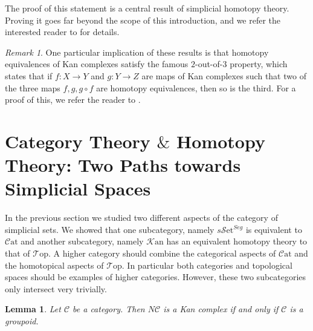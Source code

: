 \documentclass[11pt, a4paper]{amsart}
\newcommand{\cC}{\mathcal{C}}
\newcommand{\sSet}{s\mathscr{S}\mathrm{et}}
\newcommand{\Cat}{\mathscr{C}\mathrm{at}}
\newcommand{\Top}{\mathscr{T}\mathrm{op}}
\newcommand{\Kan}{\mathscr{K}\mathrm{an}}
\newtheorem{lemma}[equation]{Lemma}
\theoremstyle{definition}
\theoremstyle{remark}
\newtheorem{remark}[equation]{Remark}
\numberwithin{equation}{section}
\begin{document}
The proof of this statement is a central result of simplicial homotopy theory. Proving it goes far beyond the scope of this introduction, and we refer the interested reader to \cite{goerssjardine2009simplicialhomotopytheory} for details.

\begin{remark} \label{rem:two out of three}
  One particular implication of these results is that homotopy equivalences of Kan complexes satisfy the famous $2$-out-of-$3$ property, which states that if $f\colon X \to Y$ and $g\colon Y \to Z$ are maps of Kan complexes such that two of the three maps $f,g,g \circ f$ are homotopy equivalences, then so is the third. For a proof of this, we refer the reader to \cite[Proposition 9.2 CM2]{goerssjardine2009simplicialhomotopytheory}.
\end{remark}

\section{Category Theory \texorpdfstring{$\&$}{\&} Homotopy Theory: Two Paths towards Simplicial Spaces} \label{sec:twopaths}
In the previous section we studied two different aspects of the category of simplicial sets. We showed that one subcategory, namely $\sSet^{Seg}$ is equivalent to $\Cat$ and another subcategory, namely $\Kan$ has an equivalent homotopy theory to that of $\Top$. A higher category should combine the categorical aspects of $\Cat$ and the homotopical aspects of $\Top$. In particular both categories and topological spaces should be examples of higher categories. However, these two subcategories only intersect very trivially. 

 \begin{lemma} \label{lemma:groupoid kan complex}
  Let $\cC$ be a category. Then $N\cC$ is a Kan complex if and only if $\cC$ is a groupoid.
 \end{lemma}
\end{document}
